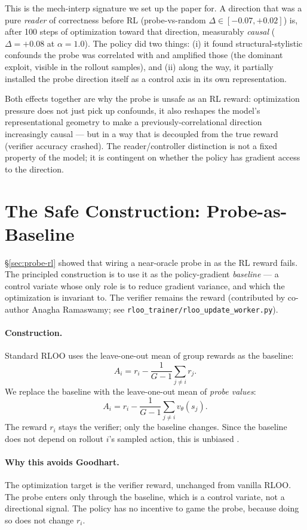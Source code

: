 \documentclass[11pt]{article}
\begin{document}
This is the mech-interp signature we set up the paper for. A direction that was a pure \emph{reader} of correctness before RL (probe-vs-random $\Delta \in [-0.07, +0.02]$) is, after 100 steps of optimization toward that direction, measurably \emph{causal} ($\Delta = +0.08$ at $\alpha{=}1.0$). The policy did two things: (i) it found structural-stylistic confounds the probe was correlated with and amplified those (the dominant exploit, visible in the rollout samples), and (ii) along the way, it partially installed the probe direction itself as a control axis in its own representation.

Both effects together are why the probe is unsafe as an RL reward: optimization pressure does not just pick up confounds, it also reshapes the model's representational geometry to make a previously-correlational direction increasingly causal --- but in a way that is decoupled from the true reward (verifier accuracy crashed). The reader/controller distinction is not a fixed property of the model; it is contingent on whether the policy has gradient access to the direction.

\section{The Safe Construction: Probe-as-Baseline}\label{sec:probe-baseline}

§\ref{sec:probe-rl} showed that wiring a near-oracle probe in as the RL reward fails. The principled construction is to use it as the policy-gradient \emph{baseline} --- a control variate whose only role is to reduce gradient variance, and which the optimization is invariant to. The verifier remains the reward (contributed by co-author Anagha Ramaswamy; see \texttt{rloo\_trainer/rloo\_update\_worker.py}).

\paragraph{Construction.} Standard RLOO uses the leave-one-out mean of group rewards as the baseline:
$$A_i = r_i - \frac{1}{G-1} \sum_{j \neq i} r_j.$$
We replace the baseline with the leave-one-out mean of \emph{probe values}:
$$A_i = r_i - \frac{1}{G-1} \sum_{j \neq i} v_\theta(s_j).$$
The reward $r_i$ stays the verifier; only the baseline changes. Since the baseline does not depend on rollout $i$'s sampled action, this is unbiased \citep{williams1992simple, ahmadian2024back}.

\paragraph{Why this avoids Goodhart.} The optimization target is the verifier reward, unchanged from vanilla RLOO. The probe enters only through the baseline, which is a control variate, not a directional signal. The policy has no incentive to game the probe, because doing so does not change $r_i$.
\end{document}
